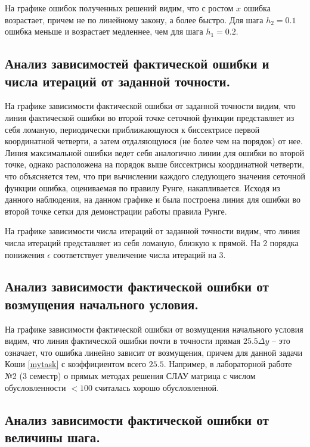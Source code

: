 \documentclass[a4paper, 12pt]{article}
\begin{document}
	На графике ошибок полученных решений видим, что с ростом $x$ ошибка возрастает, причем не по линейному закону, а более быстро. Для шага $h_2=0.1$ ошибка меньше и возрастает медленнее, чем для шага $h_1=0.2$. 
	
	\subsection{Анализ зависимостей фактической ошибки и числа итераций от заданной точности.} 
	
	На графике зависимости фактической ошибки от заданной точности видим, что линия фактической ошибки во второй точке сеточной функции представляет из себя ломаную, периодически приближающуюся к биссектрисе первой координатной четверти, а затем отдаляющуюся (не более чем на порядок) от нее. Линия максимальной ошибки ведет себя аналогично линии для ошибки во второй точке, однако расположена на порядок выше биссектрисы координатной четверти, что объясняется тем, что при вычислении каждого следующего значения сеточной функции ошибка, оцениваемая по правилу Рунге, накапливается. Исходя из данного наблюдения, на данном графике и была построена линия для ошибки во второй точке сетки для демонстрации работы правила Рунге.
	
	На графике зависимости числа итераций от заданной точности видим, что линия числа итераций представляет из себя ломаную, близкую к прямой. На 2 порядка понижения $\epsilon$ соответствует увеличение числа итераций на 3.
	
	\subsection{Анализ зависимости фактической ошибки от возмущения начального условия.}
	
	На графике зависимости фактической ошибки от возмущения начального условия видим, что линия фактической ошибки почти в точности прямая $25.5\Delta y$ -- это означает, что ошибка линейно зависит от возмущения, причем для данной задачи Коши \eqref{mytask} с коэффициентом всего $25.5$. Например, в лабораторной работе №2 (3 семестр) о прямых методах решения СЛАУ матрица с числом обусловленности $<100$ считалась хорошо обусловленной.
	
	\subsection{Анализ зависимости фактической ошибки от величины шага.}
	
\end{document}
